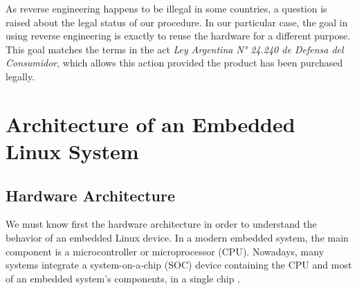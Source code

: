 \documentclass[conference]{IEEEtran}
\newcommand{\nota}[1]{}
\begin{document}
\nota{Esto plantea la inquietud acerca de la legalidad 
del proceso, debido a las posibles restricciones en las licencias de uso de cada producto
específico. En este caso en particular, sólo se usa ingeniería inversa para poder
reutilizar el hardware con un propósito diferente, lo cual es acorde con las Ley
Argentina N° 24.240 de Defensa del Consumidor (referencia :),
http://www.infoleg.gov.ar/infolegInternet/anexos/0-4999/638/texact.htm),
siempre que el producto haya sido adquirido legalmente.}

As reverse engineering happens to be illegal in some countries, a question is raised 
about the legal status of our procedure. In our particular case, the goal in using 
reverse engineering is exactly to reuse the hardware for a different purpose. This goal
matches the terms in the act \emph{Ley Argentina N° 24.240 de Defensa del Consumidor}, which allows this action provided the product has been purchased legally.



\section{Architecture of an Embedded Linux System}
\subsection{Hardware Architecture}

\nota{Para entender el funcionamiento de un dispositivo Linux embebido, es necesario, en primer lugar, conocer
la arquitectura de hardware. En un sistema embebido moderno la arquitectura
contiene como componente central, un microcontrolador o microprocesador (CPU).
Mas aún, actualmente, muchos sistemas contienen un SOC (del inglés ``system on chip''),
que contiene la CPU y gran parte de los componentes de un sistema embebido, en un
único chip \cite{arm}.
}

We must know first the hardware architecture in order to understand the behavior of an embedded Linux device. In a modern embedded system, the main component is a microcontroller or microprocessor (CPU). Nowadays, many systems integrate a system-on-a-chip (SOC) device containing the CPU and most of an embedded system's components, in a single chip \cite{arm}.


\nota {Además, es de interés conocer cuáles otros componentes conforman
el sistema. Los mas importantes, luego de conocer la CPU,
son los módulos de memoria (de
tipo RAM y de tipo Flash), y los módulos de comunicaciones (serial, usb, etc).
Ya que, en conjunto con el microprocesador, suelen dar una visión
global de cómo inicia o funciona el sistema.
}
\end{document}
